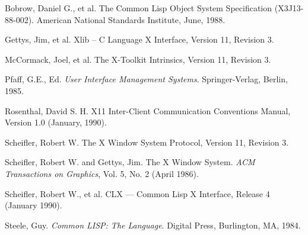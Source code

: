 %
%
%
%
%
%
%
%
\begin{thebibliography}{9}

 Bobrow, Daniel G., et al. The Common Lisp Object System
Specification (X3J13-88-002). American National Standards Institute, June,
1988.

 Gettys, Jim, et al. Xlib -- C Language X Interface, Version
11, Revision 3.

 McCormack, Joel, et al. The X-Toolkit Intrinsics, Version
11, Revision 3.

 Pfaff, G.E., Ed. {\em User Interface Management Systems}.
Springer-Verlag, Berlin, 1985.

 Rosenthal, David S. H. X11 Inter-Client Communication Conventions
Manual, Version 1.0 (January, 1990).


 Scheifler, Robert W. The X Window System Protocol, Version
11, Revision 3.

 Scheifler, Robert W. and Gettys, Jim. The X Window
System. {\em ACM Transactions on Graphics}, Vol. 5, No. 2 (April 1986).

 Scheifler, Robert W., et al. CLX --- Common Lisp X Interface,
Release 4 (January 1990).

 Steele, Guy. {\em Common LISP: The Language}. Digital Press,
Burlington, MA, 1984.


\end{thebibliography}


\begin{theindex}

\end{theindex}






